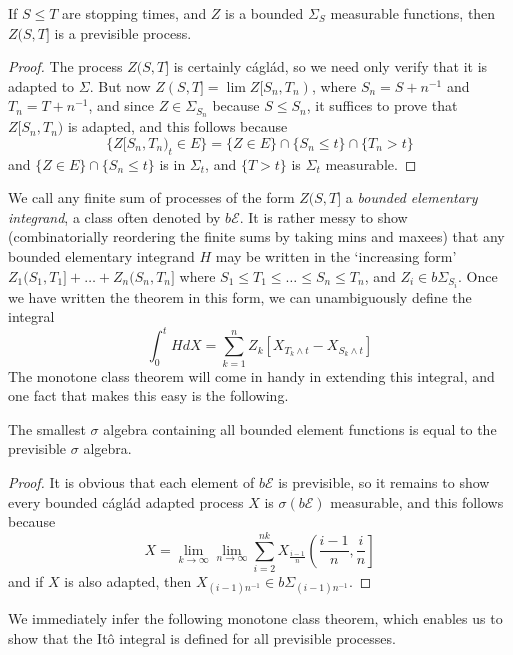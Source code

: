 \begin{lemma}
    If $S \leq T$ are stopping times, and $Z$ is a bounded $\Sigma_S$ measurable functions, then $Z(S,T]$ is a previsible process.
\end{lemma}
\begin{proof}
    The process $Z(S,T]$ is certainly c\'{a}gl\'{a}d, so we need only verify that it is adapted to $\Sigma$. But now $Z(S,T] = \lim Z[S_n,T_n)$, where $S_n = S + n^{-1}$ and $T_n = T + n^{-1}$, and since $Z \in \Sigma_{S_n}$ because $S \leq S_n$, it suffices to prove that $Z[S_n,T_n)$ is adapted, and this follows because
    \[ \{ Z[S_n,T_n)_t \in E \} = \{ Z \in E \} \cap \{ S_n \leq t \} \cap \{ T_n > t \} \]
    and $\{ Z \in E \} \cap \{ S_n \leq t \}$ is in $\Sigma_t$, and $\{ T > t \}$ is $\Sigma_t$ measurable.
\end{proof}

We call any finite sum of processes of the form $Z(S,T]$ a {\it bounded elementary integrand}, a class often denoted by $b \mathcal{E}$. It is rather messy to show (combinatorially reordering the finite sums by taking mins and maxees) that any bounded elementary integrand $H$ may be written in the `increasing form' $Z_1(S_1,T_1] + \dots + Z_n(S_n,T_n]$ where $S_1 \leq T_1 \leq \dots \leq S_n \leq T_n$, and $Z_i \in b\Sigma_{S_i}$. Once we have written the theorem in this form, we can unambiguously define the integral
%
\[ \int_0^t HdX = \sum_{k = 1}^n Z_k[X_{T_k \wedge t} - X_{S_k \wedge t}] \]
%
The monotone class theorem will come in handy in extending this integral, and one fact that makes this easy is the following.

\begin{lemma}
    The smallest $\sigma$ algebra containing all bounded element functions is equal to the previsible $\sigma$ algebra.
\end{lemma}
\begin{proof}
    It is obvious that each element of $b\mathcal{E}$ is previsible, so it remains to show every bounded c\'{a}gl\'{a}d adapted process $X$ is $\sigma(b\mathcal{E})$ measurable, and this follows because
    \[ X = \lim_{k \to \infty} \lim_{n \to \infty} \sum_{i = 2}^{nk} X_{\frac{i-1}{n}} \left( \frac{i-1}{n}, \frac{i}{n} \right] \]
    and if $X$ is also adapted, then $X_{(i-1)n^{-1}} \in b \Sigma_{(i-1)n^{-1}}$.
\end{proof}

We immediately infer the following monotone class theorem, which enables us to show that the It\^{o} integral is defined for all previsible processes.

